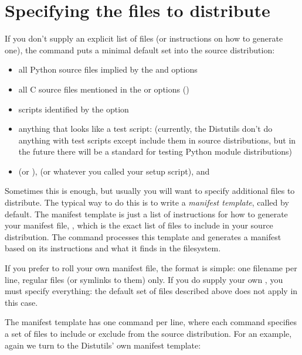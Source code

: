 \documentclass{manual}
\begin{document}
\section{Specifying the files to distribute}
\label{manifest}

If you don't supply an explicit list of files (or instructions on how to
generate one), the  command puts a minimal default set
into the source distribution:
\begin{itemize}
\item all Python source files implied by the  and
   options
\item all C source files mentioned in the  or
   options ()
\item scripts identified by the  option
\item anything that looks like a test script: 
  (currently, the Distutils don't do anything with test scripts except
  include them in source distributions, but in the future there will be
  a standard for testing Python module distributions)
\item {} (or ),  (or whatever 
  you called your setup script), and 
\end{itemize}

Sometimes this is enough, but usually you will want to specify
additional files to distribute.  The typical way to do this is to write
a \emph{manifest template}, called  by default.  The
manifest template is just a list of instructions for how to generate
your manifest file, , which is the exact list of files to
include in your source distribution.  The  command
processes this template and generates a manifest based on its
instructions and what it finds in the filesystem.

If you prefer to roll your own manifest file, the format is simple: one
filename per line, regular files (or symlinks to them) only.  If you do
supply your own , you must specify everything: the
default set of files described above does not apply in this case.

The manifest template has one command per line, where each command
specifies a set of files to include or exclude from the source
distribution.  For an example, again we turn to the Distutils' own
manifest template:
\end{document}
